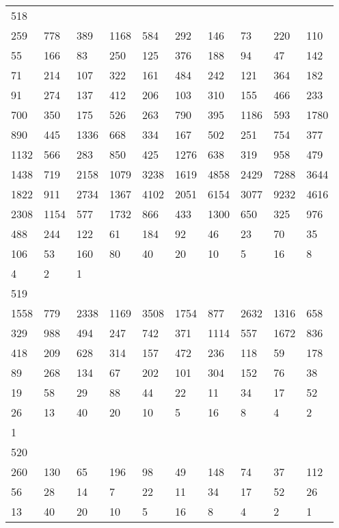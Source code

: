 \begin{longtable}{*{10}{l}}
518&&&&&&&&&\\
259& 778& 389& 1168& 584& 292& 146& 73& 220& 110\\
55& 166& 83& 250& 125& 376& 188& 94& 47& 142\\
71& 214& 107& 322& 161& 484& 242& 121& 364& 182\\
91& 274& 137& 412& 206& 103& 310& 155& 466& 233\\
700& 350& 175& 526& 263& 790& 395& 1186& 593& 1780\\
890& 445& 1336& 668& 334& 167& 502& 251& 754& 377\\
1132& 566& 283& 850& 425& 1276& 638& 319& 958& 479\\
1438& 719& 2158& 1079& 3238& 1619& 4858& 2429& 7288& 3644\\
1822& 911& 2734& 1367& 4102& 2051& 6154& 3077& 9232& 4616\\
2308& 1154& 577& 1732& 866& 433& 1300& 650& 325& 976\\
488& 244& 122& 61& 184& 92& 46& 23& 70& 35\\
106& 53& 160& 80& 40& 20& 10& 5& 16& 8\\
4& 2& 1& \\

519&&&&&&&&&\\
1558& 779& 2338& 1169& 3508& 1754& 877& 2632& 1316& 658\\
329& 988& 494& 247& 742& 371& 1114& 557& 1672& 836\\
418& 209& 628& 314& 157& 472& 236& 118& 59& 178\\
89& 268& 134& 67& 202& 101& 304& 152& 76& 38\\
19& 58& 29& 88& 44& 22& 11& 34& 17& 52\\
26& 13& 40& 20& 10& 5& 16& 8& 4& 2\\
1& \\

520&&&&&&&&&\\
260& 130& 65& 196& 98& 49& 148& 74& 37& 112\\
56& 28& 14& 7& 22& 11& 34& 17& 52& 26\\
13& 40& 20& 10& 5& 16& 8& 4& 2& 1\\


\end{longtable}

